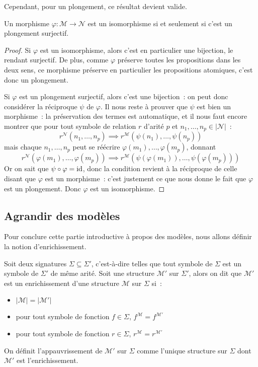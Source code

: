 Cependant, pour un plongement, ce résultat devient valide.

\begin{proposition}
  Un morphisme $\varphi : \mathcal M \to \mathcal N$ est un isomorphisme si et
  seulement si c'est un plongement surjectif.
\end{proposition}

\begin{proof}
  Si $\varphi$ est un isomorphisme, alors c'est en particulier une bijection,
  le rendant surjectif. De plus, comme $\varphi$ préserve toutes les
  propositions dans les deux sens, ce morphisme préserve en particulier les
  propositions atomiques, c'est donc un plongement.

  Si $\varphi$ est un plongement surjectif, alors c'est une bijection~: on
  peut donc considérer la réciproque $\psi$ de $\varphi$. Il nous reste à
  prouver que $\psi$ est bien un morphisme~: la préservation des termes est
  automatique, et il nous faut encore montrer que pour tout symbole de relation
  $r$ d'arité $p$ et $n_1,\ldots,n_p\in|\mathcal N|$~:
  \[r^\mathcal N(n_1,\ldots,n_p) \implies r^\mathcal M
  (\psi(n_1),\ldots,\psi(n_p))\]
  mais chaque $n_1,\ldots,n_p$ peut se réécrire
  $\varphi(m_1),\ldots,\varphi(m_p)$, donnant
  \[r^\mathcal N(\varphi(m_1),\ldots,\varphi(m_p)) \implies r^\mathcal M
  (\psi(\varphi(m_1)),\ldots,\psi(\varphi(m_p)))\]
  Or on sait que $\psi\circ \varphi = \operatorname{id}$, donc la condition revient à la
  réciproque de celle disant que $\varphi$ est un morphisme~: c'est justement
  ce que nous donne le fait que $\varphi$ est un plongement. Donc $\varphi$ est
  un isomorphisme.
\end{proof}

\subsection{Agrandir des modèles}

Pour conclure cette partie introductive à propos des modèles, nous allons
définir la notion d'enrichissement.

\begin{definition}[Enrichissement]
  Soit deux signatures $\Sigma\subseteq\Sigma'$, c'est-à-dire telles que tout
  symbole de $\Sigma$ est un symbole de $\Sigma'$ de même arité. Soit une
  structure $\mathcal M'$ sur $\Sigma'$, alors on dit que $\mathcal M'$ est un
  enrichissement d'une structure $\mathcal M$ sur $\Sigma$ si~:
  \begin{itemize}
  \item $|\mathcal M| = |\mathcal M'|$
  \item pour tout symbole de fonction $f\in \Sigma$,
    $f^{\mathcal M} = f^{\mathcal M'}$
  \item pour tout symbole de fonction $r\in \Sigma$,
    $r^{\mathcal M} = r^{\mathcal M'}$
  \end{itemize}

  On définit l'appauvrissement de $\mathcal M'$ sur $\Sigma$ comme l'unique
  structure sur $\Sigma$ dont $\mathcal M'$ est l'enrichissement.
\end{definition}

